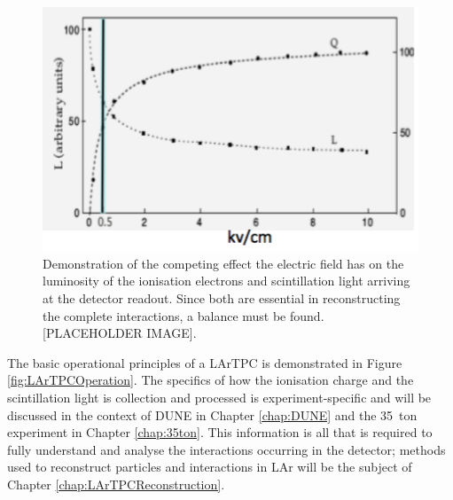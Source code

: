 \begin{figure}
  \centering
  \includegraphics[width=12cm]{ElectricFieldScintillationIonisation.png}
  \caption[Effect of electric field on luminosity of ionisation electrons and scintillation light in a LArTPC.]{Demonstration of the competing effect the electric field has on the luminosity of the ionisation electrons and scintillation light arriving at the detector readout.  Since both are essential in reconstructing the complete interactions, a balance must be found. [PLACEHOLDER IMAGE].}
  \label{fig:ElectricFieldScintillationIonisation}
\end{figure}

The basic operational principles of a LArTPC is demonstrated in Figure \ref{fig:LArTPCOperation}.  The specifics of how the ionisation charge and the scintillation light is collection and processed is experiment-specific and will be discussed in the context of DUNE in Chapter \ref{chap:DUNE} and the 35~ton experiment in Chapter \ref{chap:35ton}.  This information is all that is required to fully understand and analyse the interactions occurring in the detector; methods used to reconstruct particles and interactions in LAr will be the subject of Chapter \ref{chap:LArTPCReconstruction}.

